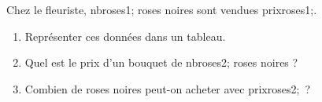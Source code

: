 \documentclass[exercice]{thedocument}%
\begin{document}
%
Chez le fleuriste, \<nbroses1; roses noires sont vendues \<prixroses1;.
\begin{enumerate}
    \item Représenter ces données dans un tableau.
    \item Quel est le prix d'un bouquet de \<nbroses2; roses noires ?
    \item Combien de roses noires peut-on acheter avec \<prixroses2;~?
\end{enumerate}
\end{document}
